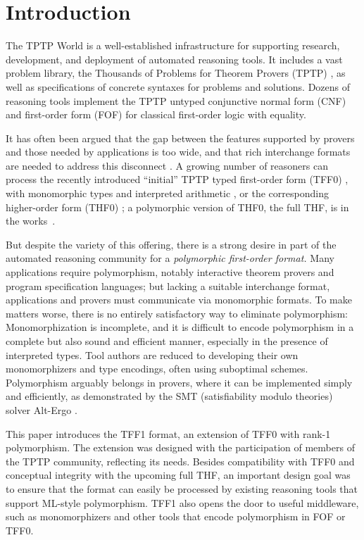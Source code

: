 \section{Introduction}
\label{sec_intro}

The TPTP World \cite{sutcliffe-2010-world} is a well-established infrastructure
for supporting research, development, and deployment of automated reasoning
tools. It includes a vast problem library, the Thousands of Problems for Theorem
Provers (TPTP) \cite{sutcliffe-2009-lib}, as well as specifications of concrete
syntaxes for problems and solutions.
Dozens of reasoning tools implement the TPTP untyped conjunctive normal form
(CNF) and first-order form (FOF) for classical
first-order logic with equality.

It has often been argued that the gap between the features supported by provers
and those needed by applications is too wide, and that rich interchange formats
are needed to address this disconnect
\cite{schumann-2001,voronkov-2003,mccune-2003,stickel-2009,kuncak-2011}.
A growing number of reasoners can process the
recently introduced ``initial'' TPTP typed first-order form (TFF0) \cite{sutcliffe-et-al-2012-tff0},
with monomorphic types and interpreted arithmetic \cite{SPASS-T,vampire-arith},
or the corresponding higher-order form (THF0) \cite{benzmueller-et-al-2008-thf0};
a polymorphic version of THF0, the full THF, is in the works~\cite{sutcliffe-benzmueller-2010}.

But despite the variety of this offering, there is a strong desire in part of the automated
reasoning community for a \emph{polymorphic first-order format.} Many applications
require polymorphism, notably interactive theorem provers and program
specification languages; but lacking a suitable interchange format, applications
and provers must communicate via monomorphic formats. To make matters worse, there is no entirely
satisfactory way to eliminate polymorphism: Monomorphization is %
incomplete, and it is difficult to encode polymorphism in a complete but
also sound and efficient manner, especially in the presence of interpreted types. Tool authors
are reduced to developing their own monomorphizers and type encodings, often
using suboptimal schemes. Polymorphism arguably belongs in
provers, where it can be implemented simply and efficiently, as demonstrated by
the SMT (satisfiability modulo theories) solver Alt-Ergo \cite{bobot-et-al-2008}.

This paper introduces the TFF1
format, an extension of TFF0 with rank-1 polymorphism. The
extension was designed with the participation of members of the TPTP community,
reflecting its needs.
Besides compatibility with TFF0 and conceptual integrity with the upcoming full
THF, an important design goal was to ensure that the format can easily be
processed by existing reasoning tools that support ML-style polymorphism. TFF1
also opens the door to useful middleware, such as monomorphizers and other
tools that encode polymorphism in FOF or TFF0.


